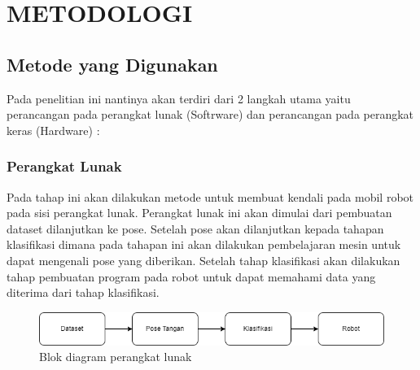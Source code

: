 \section{METODOLOGI}


\subsection{Metode yang Digunakan}

Pada penelitian ini nantinya akan terdiri dari 2 langkah utama yaitu perancangan pada perangkat lunak (Softrware) dan perancangan pada perangkat keras (Hardware) :

\subsubsection{Perangkat Lunak}
Pada tahap ini akan dilakukan metode untuk membuat kendali pada mobil robot pada sisi perangkat lunak. Perangkat lunak ini akan dimulai dari pembuatan dataset dilanjutkan ke pose. Setelah pose akan dilanjutkan kepada tahapan klasifikasi dimana pada tahapan ini akan dilakukan pembelajaran mesin untuk dapat mengenali pose yang diberikan. Setelah tahap klasifikasi akan dilakukan tahap pembuatan program pada robot untuk dapat memahami data yang diterima dari tahap klasifikasi.

\begin{figure}[!h]
	\centering
	\includegraphics[width=1\linewidth]{gambar/gambar3.1}
	\caption{Blok diagram perangkat lunak}
	\label{fig:gambar31}
\end{figure}

